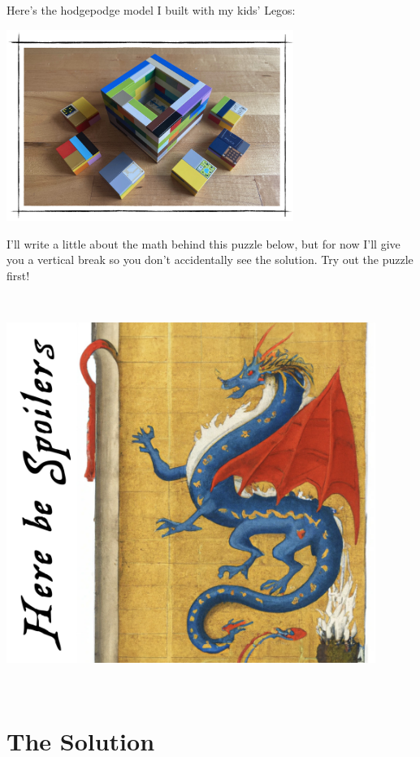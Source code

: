\documentclass[
]{article}
\begin{document}
Here's the hodgepodge model I built with my kids' Legos:

\begin{center}\includegraphics[width=0.7\textwidth]{img/home_model.jpg}\end{center}

I'll write a little about the math behind this puzzle below, but for now
I'll give you a vertical break so you don't accidentally see the
solution. Try out the puzzle first!

~ \vspace{1in}

\begin{center}\includegraphics[width=0.9\textwidth,height=\textheight]{img/here_be_spoilers.jpg}\end{center}

~ \newpage

\hypertarget{the-solution}{%
\section{The Solution}\label{the-solution}}
\end{document}
